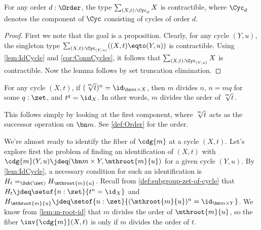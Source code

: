 \begin{lemma}\label{lem:sum-cycle-point-contr}
  For any order $d:\Order$, the type $\sum_{(X,t):\Cyc_d}X$ is contractible,
  where $\Cyc_d$ denotes the component of $\Cyc$ consisting
  of cycles of order $d$.
\end{lemma}
\begin{proof}
  First we note that the goal is a proposition.
  Clearly, for any cycle $(Y,u)$, the singleton type
  $\sum_{(X,t):\Cyc_{(Y,u)}} ((X,t)\eqto(Y,u))$ is contractible.
  Using \cref{lem:IdCycle} and \cref{cor:ConnCycles}, it follows that
  $\sum_{(X,t):\Cyc_{(Y,u)}} X$ is contractible.
  Now the lemma follows by set truncation elimination.
\end{proof}
\begin{lemma}\label{lem:m-root-id}
  For any cycle $(X,t)$, if $(\sqrt[\uproot{2}m]{t})^n = \id_{\bn m \times X}$,
  then $m$ divides $n$, \ie $n=mq$ for some $q:\zet$, and $t^q=\id_X$.
  In other words, $m$ divides the order of $\sqrt[\uproot{2}m]{t}$.
\end{lemma}
This follows simply by looking at the first component,
where $\sqrt[\uproot{2}m]{t}$ acts as the successor operation on $\bn m$.
See \cref{def:Order} for the order.

We're almost ready to identify the fiber of $\cdg{m}$ at a cycle $(X,t)$.
Let's explore first the problem of finding an identification of $(X,t)$ with
$\cdg{m}(Y,u)\jdeq(\bn m\times Y, \mthroot{m}{u})$ for a given cycle $(Y,u)$.
By \cref{lem:IdCycle}, a necessary condition for such an identification
is $H_t =_{\Sub(\zet)} H_{\mthroot{m}{u}}$.
Recall from \cref{def:subgroup-zet-of-cycle}
that $H_t \jdeq \setof{n:\zet}{t^n=\id_X}$ and
$H_{\mthroot{m}{u}} \jdeq \setof{n:\zet}{(\mthroot{m}{u})^n=\id_{\bn m \times Y}}$.
We know from \cref{lem:m-root-id} that $m$ divides the order of
$\mthroot{m}{u}$, so the fiber $\inv{\cdg{m}}(X,t)$ is \nonempty only if
$m$ divides the order of $t$.

